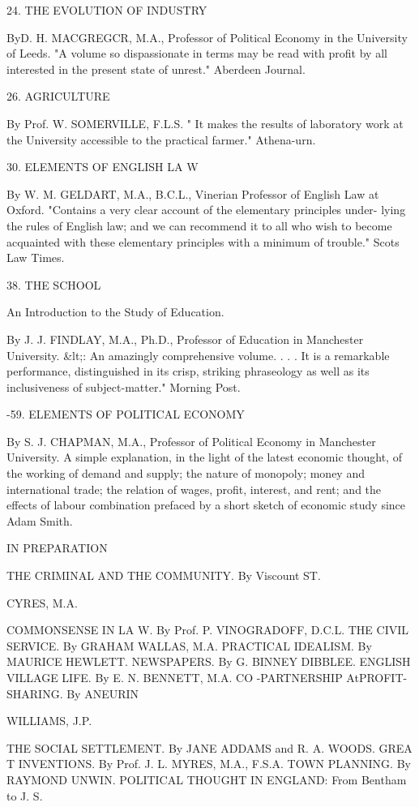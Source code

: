 \documentclass[12pt,leqno]{book}[2005/09/16]
\begin{document}
24. THE EVOLUTION OF INDUSTRY

ByD. H. MACGREGCR, M.A., Professor of Political Economy in the University
of Leeds. "A volume so dispassionate in terms may be read with profit by all
interested in the present state of unrest." Aberdeen Journal.

26. AGRICULTURE

By Prof. W. SOMERVILLE, F.L.S. " It makes the results of laboratory work
at the University accessible to the practical farmer." Athena-urn.

30. ELEMENTS OF ENGLISH LA W

By W. M. GELDART, M.A., B.C.L., Vinerian Professor of English Law at
Oxford. "Contains a very clear account of the elementary principles under-
lying the rules of English law; and we can recommend it to all who wish to
become acquainted with these elementary principles with a minimum of
trouble." Scots Law Times.

38. THE SCHOOL

An Introduction to the Study of Education.

By J. J. FINDLAY, M.A., Ph.D., Professor of Education in Manchester
University. &lt;: An amazingly comprehensive volume. . . . It is a remarkable
performance, distinguished in its crisp, striking phraseology as well as its
inclusiveness of subject-matter." Morning Post.

-59. ELEMENTS OF POLITICAL ECONOMY

By S. J. CHAPMAN, M.A., Professor of Political Economy in Manchester
University. A simple explanation, in the light of the latest economic thought,
of the working of demand and supply; the nature of monopoly; money and
international trade; the relation of wages, profit, interest, and rent; and the
effects of labour combination prefaced by a short sketch of economic study
since Adam Smith.

IN PREPARATION

THE CRIMINAL AND THE COMMUNITY. By Viscount ST.

CYRES, M.A.

COMMONSENSE IN LA W. By Prof. P. VINOGRADOFF, D.C.L.
THE CIVIL SERVICE. By GRAHAM WALLAS, M.A.
PRACTICAL IDEALISM. By MAURICE HEWLETT.
NEWSPAPERS. By G. BINNEY DIBBLEE.
ENGLISH VILLAGE LIFE. By E. N. BENNETT, M.A.
CO -PARTNERSHIP At\D PROFIT-SHARING. By ANEURIN

WILLIAMS, J.P.

THE SOCIAL SETTLEMENT. By JANE ADDAMS and R. A. WOODS.
GREA T INVENTIONS. By Prof. J. L. MYRES, M.A., F.S.A.
TOWN PLANNING. By RAYMOND UNWIN.
POLITICAL THOUGHT IN ENGLAND: From Bentham to J. S.
\end{document}
